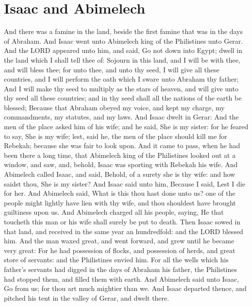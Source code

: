 \section*{Isaac and Abimelech}
\begin{biblechapter} %
\verse And there was a famine in the land, beside the first famine that was in the days of Abraham. And Isaac went unto Abimelech king of the Philistines unto Gerar.
\verse And the LORD appeared unto him, and said, Go not down into Egypt; dwell in the land which I shall tell thee of:
\verse Sojourn in this land, and I will be with thee, and will bless thee; for unto thee, and unto thy seed, I will give all these countries, and I will perform the oath which I sware unto Abraham thy father;
\verse And I will make thy seed to multiply as the stars of heaven, and will give unto thy seed all these countries; and in thy seed shall all the nations of the earth be blessed;
\verse Because that Abraham obeyed my voice, and kept my charge, my commandments, my statutes, and my laws.
\verse And Isaac dwelt in Gerar:
\verse And the men of the place asked him of his wife; and he said, She is my sister: for he feared to say, She is my wife; lest, said he, the men of the place should kill me for Rebekah; because she was fair to look upon.
\verse And it came to pass, when he had been there a long time, that Abimelech king of the Philistines looked out at a window, and saw, and, behold, Isaac was sporting with Rebekah his wife.
\verse And Abimelech called Isaac, and said, Behold, of a surety she is thy wife: and how saidst thou, She is my sister? And Isaac said unto him, Because I said, Lest I die for her.
\verse And Abimelech said, What is this thou hast done unto us? one of the people might lightly have lien with thy wife, and thou shouldest have brought guiltiness upon us.
\verse And Abimelech charged all his people, saying, He that toucheth this man or his wife shall surely be put to death.
\verse Then Isaac sowed in that land, and received in the same year an hundredfold: and the LORD blessed him.
\verse And the man waxed great, and went forward, and grew until he became very great:
\verse For he had possession of flocks, and possession of herds, and great store of servants: and the Philistines envied him.
\verse For all the wells which his father's servants had digged in the days of Abraham his father, the Philistines had stopped them, and filled them with earth.
\verse And Abimelech said unto Isaac, Go from us; for thou art much mightier than we.
\verse And Isaac departed thence, and pitched his tent in the valley of Gerar, and dwelt there.

\end{biblechapter}

